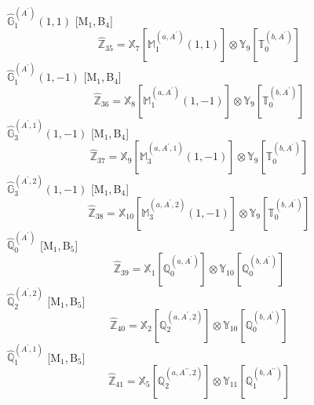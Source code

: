 \documentclass[fleqn,10pt,landscape]{article}
\begin{document}
\begin{itemize}
\begin{dmath*}
\end{dmath*}
\vspace{4mm}
\noindent {} $\,\,\,\hat{\mathbb{G}}_{1}^{(A^{\prime})}(1,1)$ [M$_{1}$,\,B$_{4}$]
\begin{dmath*}
\hat{\mathbb{Z}}_{35}=\mathbb{X}_{7}[\mathbb{M}_{1}^{(a,A^{\prime})}(1,1)] \otimes\mathbb{Y}_{9}[\mathbb{T}_{0}^{(b,A^{\prime})}]
\end{dmath*}
\vspace{4mm}
\noindent {} $\,\,\,\hat{\mathbb{G}}_{1}^{(A^{\prime})}(1,-1)$ [M$_{1}$,\,B$_{4}$]
\begin{dmath*}
\hat{\mathbb{Z}}_{36}=\mathbb{X}_{8}[\mathbb{M}_{1}^{(a,A^{\prime})}(1,-1)] \otimes\mathbb{Y}_{9}[\mathbb{T}_{0}^{(b,A^{\prime})}]
\end{dmath*}
\vspace{4mm}
\noindent {} $\,\,\,\hat{\mathbb{G}}_{3}^{(A^{\prime},1)}(1,-1)$ [M$_{1}$,\,B$_{4}$]
\begin{dmath*}
\hat{\mathbb{Z}}_{37}=\mathbb{X}_{9}[\mathbb{M}_{3}^{(a,A^{\prime},1)}(1,-1)] \otimes\mathbb{Y}_{9}[\mathbb{T}_{0}^{(b,A^{\prime})}]
\end{dmath*}
\vspace{4mm}
\noindent {} $\,\,\,\hat{\mathbb{G}}_{3}^{(A^{\prime},2)}(1,-1)$ [M$_{1}$,\,B$_{4}$]
\begin{dmath*}
\hat{\mathbb{Z}}_{38}=\mathbb{X}_{10}[\mathbb{M}_{3}^{(a,A^{\prime},2)}(1,-1)] \otimes\mathbb{Y}_{9}[\mathbb{T}_{0}^{(b,A^{\prime})}]
\end{dmath*}
\vspace{4mm}
\noindent {} $\,\,\,\hat{\mathbb{Q}}_{0}^{(A^{\prime})}$ [M$_{1}$,\,B$_{5}$]
\begin{dmath*}
\hat{\mathbb{Z}}_{39}=\mathbb{X}_{1}[\mathbb{Q}_{0}^{(a,A^{\prime})}] \otimes\mathbb{Y}_{10}[\mathbb{Q}_{0}^{(b,A^{\prime})}]
\end{dmath*}
\vspace{4mm}
\noindent {} $\,\,\,\hat{\mathbb{Q}}_{2}^{(A^{\prime},2)}$ [M$_{1}$,\,B$_{5}$]
\begin{dmath*}
\hat{\mathbb{Z}}_{40}=\mathbb{X}_{2}[\mathbb{Q}_{2}^{(a,A^{\prime},2)}] \otimes\mathbb{Y}_{10}[\mathbb{Q}_{0}^{(b,A^{\prime})}]
\end{dmath*}
\vspace{4mm}
\noindent {} $\,\,\,\hat{\mathbb{Q}}_{1}^{(A^{\prime},1)}$ [M$_{1}$,\,B$_{5}$]
\begin{dmath*}
\hat{\mathbb{Z}}_{41}=\mathbb{X}_{5}[\mathbb{Q}_{2}^{(a,A^{\prime\prime},2)}] \otimes\mathbb{Y}_{11}[\mathbb{Q}_{1}^{(b,A^{\prime\prime})}]

\end{dmath*}
\end{itemize}
\end{document}
